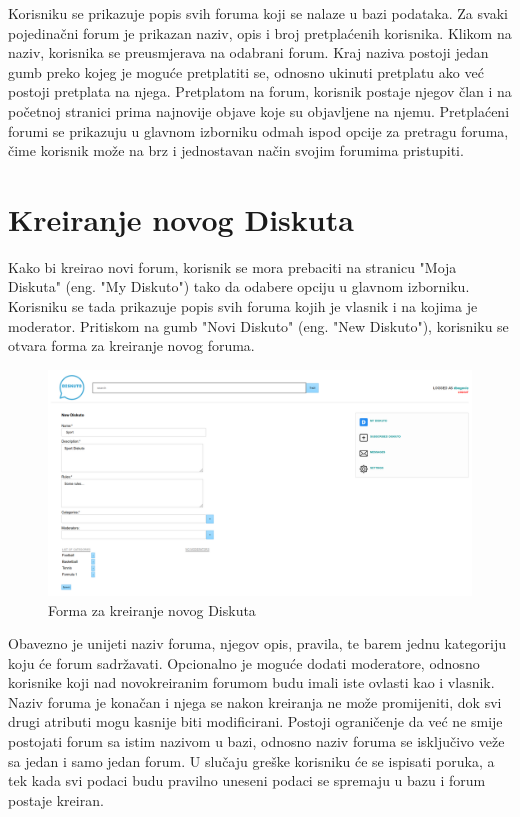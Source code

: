 \documentclass{foi}
\begin{document}
Korisniku se prikazuje popis svih foruma koji se nalaze u bazi podataka.  Za svaki pojedinačni forum je prikazan naziv, opis i broj pretplaćenih korisnika. Klikom na naziv, korisnika se preusmjerava na odabrani forum. Kraj naziva postoji jedan gumb preko kojeg je moguće pretplatiti se, odnosno ukinuti pretplatu ako već postoji pretplata na njega. Pretplatom na forum, korisnik postaje njegov član i na početnoj stranici prima najnovije objave koje su objavljene na njemu. Pretplaćeni forumi se prikazuju u glavnom izborniku odmah ispod opcije za pretragu foruma, čime korisnik može na brz i jednostavan način svojim forumima pristupiti.

\section{Kreiranje novog Diskuta}

Kako bi kreirao novi forum, korisnik se mora prebaciti na stranicu "Moja Diskuta" (eng. "My Diskuto") tako da odabere opciju u glavnom izborniku. Korisniku se tada prikazuje popis svih foruma kojih je vlasnik i na kojima je moderator. Pritiskom na gumb "Novi Diskuto" (eng. "New Diskuto"), korisniku se otvara forma za kreiranje novog foruma.

\begin{figure}[h!]
    \centering
    \includegraphics[width=1\textwidth]{slike/novi-forum.png}
    \caption{Forma za kreiranje novog Diskuta}
\end{figure}

Obavezno je unijeti naziv foruma, njegov opis, pravila, te barem jednu kategoriju koju će forum sadržavati. Opcionalno je moguće dodati moderatore, odnosno korisnike koji nad novokreiranim  forumom budu imali iste ovlasti kao i vlasnik. Naziv foruma je konačan i njega se nakon kreiranja ne može promijeniti, dok svi drugi atributi mogu kasnije biti modificirani. Postoji ograničenje da već ne smije postojati forum sa istim nazivom u bazi, odnosno naziv foruma se isključivo veže sa jedan i samo jedan forum. U slučaju greške korisniku će se ispisati poruka, a tek kada svi podaci budu pravilno uneseni podaci se spremaju u bazu i forum postaje kreiran.
\end{document}
